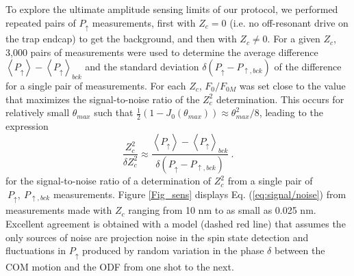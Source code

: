 \documentclass[aps,prl,twocolumn,superscriptaddress,floatfix]{revtex4-1}
\begin{document}
To explore the ultimate amplitude sensing limits of our protocol, we performed repeated pairs of $P_{\uparrow}$ measurements,
first with $Z_c = 0$ (i.e. no off-resonant drive on the trap endcap)
to get the background, and then with $Z_{c}\neq0$. For a given $Z_{c}$,
3,000 pairs of measurements were used to determine the average difference $\left\langle P_{\uparrow}\right\rangle -\left\langle P_{\uparrow}\right\rangle _{bck}$
and the standard deviation $\delta\left( P_{\uparrow} - P_{\uparrow ,bck} \right)$
of the difference for a single pair of measurements. For each $Z_c$, $F_{0}/F_{0M}$ was set close to the value that maximizes the signal-to-noise ratio of
the $Z_{c}^{2}$ determination. This occurs for relatively small
$\theta_{max}$ such that $\frac{1}{2}\left(1-J_{0}\left(\theta_{max}\right)\right)\approx\theta_{max}^{2}/8$, leading to the expression 
\begin{equation}
\frac{Z_{c}^{2}}{\delta Z_{c}^{2}}\approx\frac{\left\langle P_{\uparrow}\right\rangle -\left\langle P_{\uparrow}\right\rangle  _{bck}}{\delta\left( P_{\uparrow} - P_{\uparrow , bck} \right)}\:.\label{eq:signal/noise}
\end{equation}
for the signal-to-noise ratio of a determination of $Z_{c}^{2}$ from a single pair of $\ P_{\uparrow},\: P_{\uparrow, bck}$ measurements. Figure \ref{Fig_sens} displays Eq. (\ref{eq:signal/noise}) from measurements made with $Z_{c}$
ranging from 10 nm to as small as 0.025 nm. Excellent agreement is
obtained with a model (dashed red line) that assumes the only sources
of noise are projection noise in the spin state detection and fluctuations
in $P_{\uparrow}$ produced by random variation in the phase $\delta$ between the COM motion and the ODF from one shot to the next.
\end{document}
